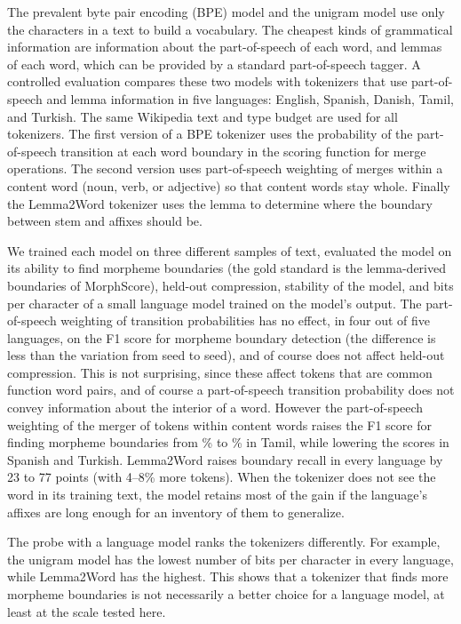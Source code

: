 The prevalent byte pair encoding (BPE) model and the unigram model use only the characters in a text to build a vocabulary. The cheapest kinds of grammatical information are information about the part-of-speech of each word, and lemmas of each word, which can be provided by a standard part-of-speech tagger. A controlled evaluation compares these two models with tokenizers that use part-of-speech and lemma information in five languages: English, Spanish, Danish, Tamil, and Turkish. The same Wikipedia text and \nVocabBudget{} type budget are used for all tokenizers. The first version of a BPE tokenizer uses the probability of the part-of-speech transition at each word boundary in the scoring function for merge operations. The second version uses part-of-speech weighting of merges within a content word (noun, verb, or adjective) so that content words stay whole. Finally the Lemma2Word tokenizer uses the lemma to determine where the boundary between stem and affixes should be.

We trained each model on three different samples of text, evaluated the model on its ability to find morpheme boundaries (the gold standard is the lemma-derived boundaries of MorphScore), held-out compression, stability of the model, and bits per character of a small language model trained on the model's output. The part-of-speech weighting of transition probabilities has no effect, in four out of five languages, on the F1 score for morpheme boundary detection (the difference is less than the variation from seed to seed), and of course does not affect held-out compression. This is not surprising, since these affect tokens that are common function word pairs, and of course a part-of-speech transition probability does not convey information about the interior of a word. However the part-of-speech weighting of the merger of tokens within content words raises the F1 score for finding morpheme boundaries from \nFBpeTamil\% to \nFPosContentTamil\% in Tamil, while lowering the scores in Spanish and Turkish. Lemma2Word raises boundary recall in every language by 23 to 77 points (with 4--8\% more tokens). When the tokenizer does not see the word in its training text, the model retains most of the gain if the language's affixes are long enough for an inventory of them to generalize.

The probe with a language model ranks the tokenizers differently. For example, the unigram model has the lowest number of bits per character in every language, while Lemma2Word has the highest. This shows that a tokenizer that finds more morpheme boundaries is not necessarily a better choice for a language model, at least at the scale tested here.
